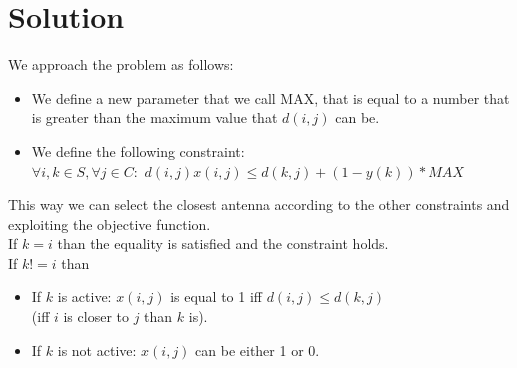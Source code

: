 \documentclass[1pt]{article}
\begin{document}
	\section{Solution}
		We approach the problem as follows:
		\begin{itemize}
			\item We define a new parameter that we call MAX, that is equal to a number that is greater than the maximum value that $d(i,j)$ can be.
			\item We define the following constraint: \\$\forall i, k \in S, \forall j \in C:$ $d(i,j) x(i,j) \leq d(k,j) + (1-y(k))*MAX$
		\end{itemize}
		This way we can select the closest antenna according to the other constraints and exploiting the objective function.\\
		If $k=i$ than the equality is satisfied and the constraint holds.\\
		If $k!=i$ than
		\begin{itemize}
			\item If $k$ is active: $x(i, j)$ is equal to 1 iff $d(i,j) \leq d(k,j)$ \\(iff $i$ is closer to $j$ than $k$ is).
			\item If $k$ is not active: $x(i, j)$ can be either 1 or 0.
		\end{itemize}  
\end{document}
